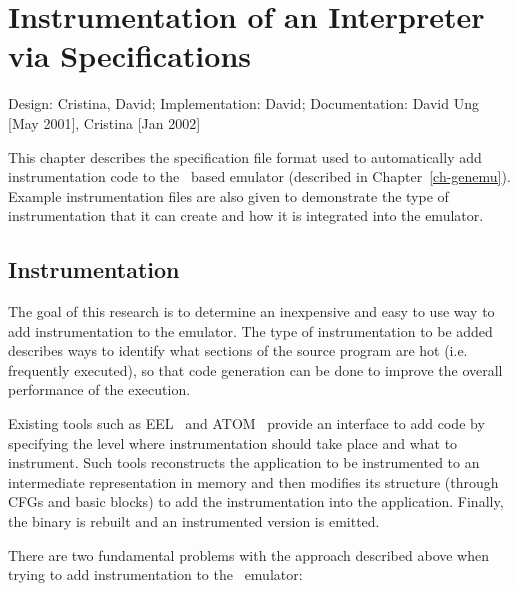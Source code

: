 \chapter{Instrumentation of an Interpreter via Specifications}
\label{ch-genemu-instr}

{\small
\begin{flushright}
Design: Cristina, David; Implementation: David; 
Documentation: David Ung [May 2001], Cristina [Jan 2002]
\end{flushright}
}

This chapter describes the specification file format used to automatically 
add instrumentation code to the \walk\ based emulator (described in 
Chapter~\ref{ch-genemu}). 
Example instrumentation files are also given to demonstrate the type of 
instrumentation that it can create and how it is integrated into the emulator.


\section{Instrumentation}
The goal of this research is to determine an inexpensive and easy to use way 
to add instrumentation to the emulator.  The type of instrumentation to be 
added describes ways to identify what sections of the source program are hot 
(i.e. frequently executed), so that code generation can be done to improve 
the overall performance of the execution.

Existing tools such as EEL~\cite{Laru95} and ATOM~\cite{Eust95} provide an 
interface to add code by specifying the level where instrumentation should 
take place and what to instrument.  
Such tools reconstructs the application to be instrumented 
to an intermediate representation in memory and then modifies its structure 
(through CFGs and basic blocks) to add the instrumentation into the application.
Finally, the binary is rebuilt and an instrumented version is emitted.

There are two fundamental problems with the approach described above when 
trying to add instrumentation to the \walk\ emulator:

